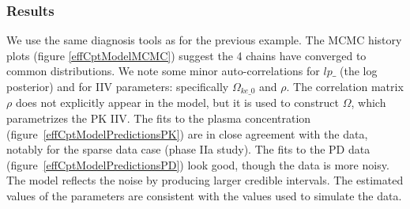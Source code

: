 \documentclass[11pt]{amsart}
\begin{document}
\subsubsection*{Results} We use the same diagnosis tools as for the previous example. The MCMC history plots (figure \ref{effCptModelMCMC}) suggest the 4 chains have converged to common distributions. We note some minor auto-correlations for $lp\_$ (the log posterior) and for IIV parameters: specifically $\Omega_{ke\_0}$ and $\rho$. The correlation matrix $\rho$ does not explicitly appear in the model, but it is used to construct $\Omega$, which parametrizes the PK IIV. The fits to the plasma concentration  (figure~\ref{effCptModelPredictionsPK}) are in close agreement with the data, notably for the sparse data case (phase IIa study). The fits to the PD data (figure~\ref{effCptModelPredictionsPD}) look good, though the data is more noisy. The model reflects the noise by producing larger credible intervals. The estimated values of the parameters are consistent with the values used to simulate the data.
\end{document}
